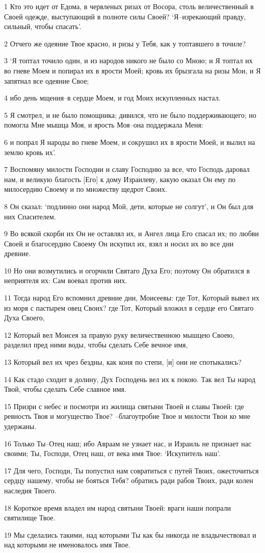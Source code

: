 \par 1 Кто это идет от Едома, в червленых ризах от Восора, столь величественный в Своей одежде, выступающий в полноте силы Своей? `Я--изрекающий правду, сильный, чтобы спасать'.
\par 2 Отчего же одеяние Твое красно, и ризы у Тебя, как у топтавшего в точиле?
\par 3 `Я топтал точило один, и из народов никого не было со Мною; и Я топтал их во гневе Моем и попирал их в ярости Моей; кровь их брызгала на ризы Мои, и Я запятнал все одеяние Свое;
\par 4 ибо день мщения--в сердце Моем, и год Моих искупленных настал.
\par 5 Я смотрел, и не было помощника; дивился, что не было поддерживающего; но помогла Мне мышца Моя, и ярость Моя--она поддержала Меня:
\par 6 и попрал Я народы во гневе Моем, и сокрушил их в ярости Моей, и вылил на землю кровь их'.
\par 7 Воспомяну милости Господни и славу Господню за все, что Господь даровал нам, и великую благость [Его] к дому Израилеву, какую оказал Он ему по милосердию Своему и по множеству щедрот Своих.
\par 8 Он сказал: `подлинно они народ Мой, дети, которые не солгут', и Он был для них Спасителем.
\par 9 Во всякой скорби их Он не оставлял их, и Ангел лица Его спасал их; по любви Своей и благосердию Своему Он искупил их, взял и носил их во все дни древние.
\par 10 Но они возмутились и огорчили Святаго Духа Его; поэтому Он обратился в неприятеля их: Сам воевал против них.
\par 11 Тогда народ Его вспомнил древние дни, Моисеевы: где Тот, Который вывел их из моря с пастырем овец Своих? где Тот, Который вложил в сердце его Святаго Духа Своего,
\par 12 Который вел Моисея за правую руку величественною мышцею Своею, разделил пред ними воды, чтобы сделать Себе вечное имя,
\par 13 Который вел их чрез бездны, как коня по степи, [и] они не спотыкались?
\par 14 Как стадо сходит в долину, Дух Господень вел их к покою. Так вел Ты народ Твой, чтобы сделать Себе славное имя.
\par 15 Призри с небес и посмотри из жилища святыни Твоей и славы Твоей: где ревность Твоя и могущество Твое? --благоутробие Твое и милости Твои ко мне удержаны.
\par 16 Только Ты--Отец наш; ибо Авраам не узнает нас, и Израиль не признает нас своими; Ты, Господи, Отец наш, от века имя Твое: `Искупитель наш'.
\par 17 Для чего, Господи, Ты попустил нам совратиться с путей Твоих, ожесточиться сердцу нашему, чтобы не бояться Тебя? обратись ради рабов Твоих, ради колен наследия Твоего.
\par 18 Короткое время владел им народ святыни Твоей: враги наши попрали святилище Твое.
\par 19 Мы сделались такими, над которыми Ты как бы никогда не владычествовал и над которыми не именовалось имя Твое.

